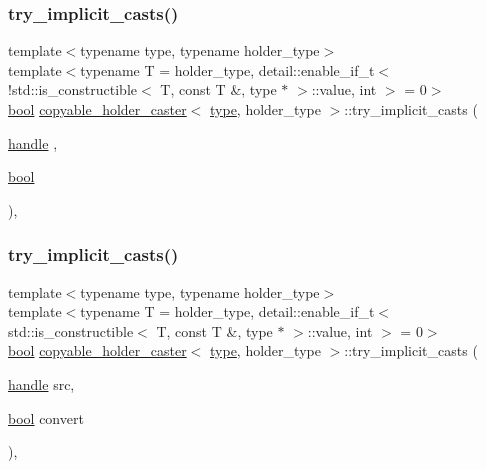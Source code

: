 \subsubsection{\texorpdfstring{try\_implicit\_casts()}{try\_implicit\_casts()}\hspace{0.1cm}{\footnotesize\ttfamily [1/2]}}
{\footnotesize\ttfamily template$<$typename type, typename holder\+\_\+type$>$ \\
template$<$typename T  = holder\+\_\+type, detail\+::enable\+\_\+if\+\_\+t$<$!std\+::is\+\_\+constructible$<$ T, const T \&, type $\ast$ $>$\+::value, int $>$  = 0$>$ \\
\mbox{\hyperlink{asdl_8h_af6a258d8f3ee5206d682d799316314b1}{bool}} \mbox{\hyperlink{structcopyable__holder__caster}{copyable\+\_\+holder\+\_\+caster}}$<$ \mbox{\hyperlink{_s_d_l__opengl_8h_ad5ddf6fca7b585646515660e810e0188}{type}}, holder\+\_\+type $>$\+::try\+\_\+implicit\+\_\+casts (\begin{DoxyParamCaption}\item[{\mbox{\hyperlink{classhandle}{handle}}}]{,  }\item[{\mbox{\hyperlink{asdl_8h_af6a258d8f3ee5206d682d799316314b1}{bool}}}]{ }\end{DoxyParamCaption})\hspace{0.3cm}{\ttfamily [inline]}, {\ttfamily [protected]}}

\mbox{\label{structcopyable__holder__caster_a9dbbb61be9263940f6bda512f25e5443}} 
\subsubsection{\texorpdfstring{try\_implicit\_casts()}{try\_implicit\_casts()}\hspace{0.1cm}{\footnotesize\ttfamily [2/2]}}
{\footnotesize\ttfamily template$<$typename type, typename holder\+\_\+type$>$ \\
template$<$typename T  = holder\+\_\+type, detail\+::enable\+\_\+if\+\_\+t$<$ std\+::is\+\_\+constructible$<$ T, const T \&, type $\ast$ $>$\+::value, int $>$  = 0$>$ \\
\mbox{\hyperlink{asdl_8h_af6a258d8f3ee5206d682d799316314b1}{bool}} \mbox{\hyperlink{structcopyable__holder__caster}{copyable\+\_\+holder\+\_\+caster}}$<$ \mbox{\hyperlink{_s_d_l__opengl_8h_ad5ddf6fca7b585646515660e810e0188}{type}}, holder\+\_\+type $>$\+::try\+\_\+implicit\+\_\+casts (\begin{DoxyParamCaption}\item[{\mbox{\hyperlink{classhandle}{handle}}}]{src,  }\item[{\mbox{\hyperlink{asdl_8h_af6a258d8f3ee5206d682d799316314b1}{bool}}}]{convert }\end{DoxyParamCaption})\hspace{0.3cm}{\ttfamily [inline]}, {\ttfamily [protected]}}



